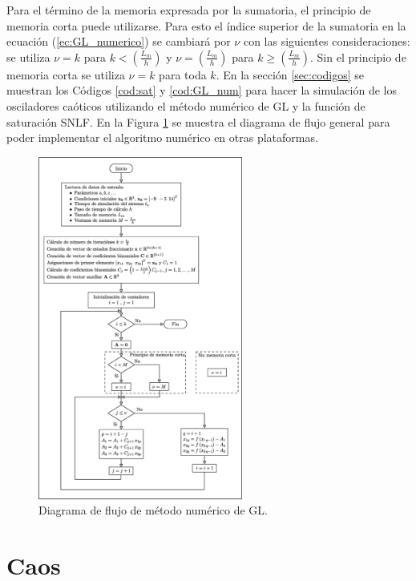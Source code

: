 \documentclass[10pt,a4paper]{article}
\begin{document}
	Para el término de la memoria expresada por la sumatoria, el principio de memoria corta puede utilizarse. Para esto el índice superior de la sumatoria en la ecuación (\ref{ec:GL_numerico}) se cambiará por $\nu$ con las siguientes consideraciones: se utiliza $\nu = k$ para $k < \left( \frac{L_{m}}{h} \right)$ y $\nu = \left( \frac{L_{m}}{h} \right)$ para $k \geq (\frac{L_{m}}{h})$. Sin el principio de memoria corta se utiliza $\nu = k$ para toda $k$. En la sección \ref{sec:codigos} se muestran los Códigos \ref{cod:sat} y \ref{cod:GL_num} para hacer la simulación de los osciladores caóticos utilizando el método numérico de GL y la función de saturación SNLF. En la Figura \ref{fig:diagrama_flujo} se muestra el diagrama de flujo general para poder implementar el algoritmo numérico en otras plataformas.
	
	
	\begin{figure}[h!]
	\centering
	\includegraphics[width=0.6\textwidth]{imagenes/diag_flug_GL.eps}
	\caption{Diagrama de flujo de método numérico de GL.}
	\label{fig:diagrama_flujo}
	\end{figure}
	
	

	\section{Caos}
	
\end{document}
